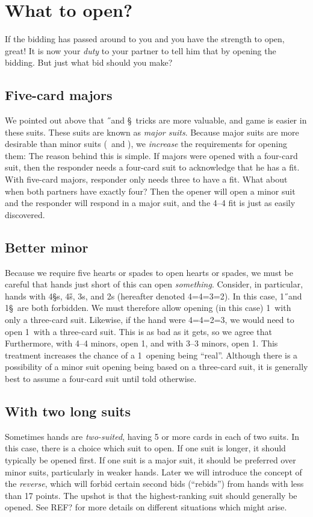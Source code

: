 \documentclass[oneside]{memoir}
\begin{document}
\section{What to open?}
If the bidding has passed around to you and you have the strength to open,
great!  It is now your \textit{duty} to your partner to tell him that by
opening the bidding.  But just what bid should you make?
\subsection{Five-card majors}
We pointed out above that \H\ and \S\ tricks are more valuable, and game
is easier in these suits.  These suits are known as \textit{major suits}.
Because major suits are more desirable than  minor suits (\C\ and \D),
we \textit{increase} the requirements for opening them:
The reason behind this is simple.  If majors were opened with a four-card
suit, then the responder needs a four-card suit to acknowledge that he
has a fit.  With five-card majors, responder only needs three to have
a fit.  What about when both partners have exactly four?  Then the opener
will open a minor suit and the responder will respond in a major suit, and
the 4--4 fit is just as easily discovered.
\subsection{Better minor}
Because we require five hearts or spades to open hearts or spades, we must
be careful that hands just short of this can open \textit{something}.  Consider,
in particular, hands with 4\S s, 4\H s, 3\D s, and 2\C s (hereafter denoted
4=4=3=2).  In this case, 1\H\ and 1\S\ are both forbidden.  We must therefore
allow opening (in this case) 1\D\ with only a three-card suit.  Likewise, if
the hand were 4=4=2=3, we would need to open 1\C\ with a three-card suit.
This is as bad as it gets, so we agree that
Furthermore, with 4--4 minors, open 1\D, and with 3--3 minors, open 1\C.
This treatment increases the chance of a 1\D\ opening being ``real''.
Although there is a possibility of a minor suit opening being based on
a three-card suit, it is generally best to assume a four-card suit until
told otherwise.

\subsection{With two long suits}
Sometimes hands are \textit{two-suited}, having 5 or more cards in each of
two suits.  In this case, there is a choice which suit to open.  If one
suit is longer, it should typically be opened first.  If one suit is a
major suit, it should be preferred over minor suits, particularly in
weaker hands.  Later we will introduce the concept of the \textit{reverse},
which will forbid certain second bids (``rebids'') from hands with less
than 17 points.  The upshot is that the highest-ranking suit should generally
be opened.  See REF? for more details on different situations which might
arise.
\end{document}
